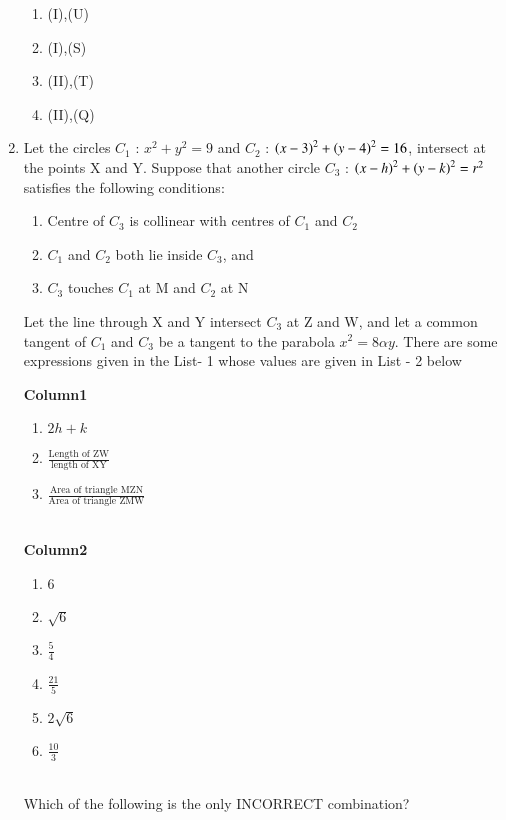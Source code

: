 \documentclass[journal,12pt,twocolumn]{IEEEtran}
\theoremstyle{remark}
\begin{document}
\begin{enumerate}
\begin{enumerate}[label=(\alph*)]
\item (I),(U)
\item (I),(S)
 \item (II),(T)    
 \item (II),(Q)

 \end{enumerate}


\item Let the circles $C_{1}$ : $x^2+y^2=9$ and $C_{2}$ : $\left(x-3\right)^2+\left(y-4\right)^2=16$, intersect at the points X and Y. Suppose that another circle $C_{3}$ : $\left(x-h\right)^2+\left(y-k\right)^2=r^2$ satisfies the following conditions: 

\begin{enumerate}[label=(\roman*)]                       
\item Centre of $C_{3}$ is collinear with centres of $C_{1}$ and $C_{2}$                         
\item $C_{1}$ and $C_{2}$ both lie inside $C_{3}$, and                                            
\item $C_{3}$ touches $C_{1}$ at M and $C_{2}$ at N
\end{enumerate}                              
Let the line through X and Y intersect $C_{3}$ at Z and W, and let a common tangent of $C_{1}$ and $C_{3}$ be a tangent to the parabola $x^2=8\alpha y$.
There are some expressions given in the List- 1 whose values are given in List - 2 below
		

\begin{multicols}


	\textbf{Column{1}}

\begin{enumerate}[label=(\Alph*)]

 \item $2h+k$
 \item $\frac{\text{Length of ZW}}{\text{length of XY}}$
\item $\frac{\text{Area of triangle MZN}}{\text{Area of triangle ZMW}}$             
\end{enumerate} \\                            
 \textbf{Column{2}}

 \begin{enumerate}[label=(\alph*) , start=16]                                              
 \item 6                                      
 \item $\sqrt{6}$                              
 \item $\frac{5}{4}$                          
 \item $\frac{21}{5}$                          
 \item $2\sqrt{6}$               
 \item $\frac{10}{3}$                         
 \end{enumerate} \\    
 Which of the following is the only INCORRECT combination?



\end{multicols}
\end{enumerate}
\end{document}

